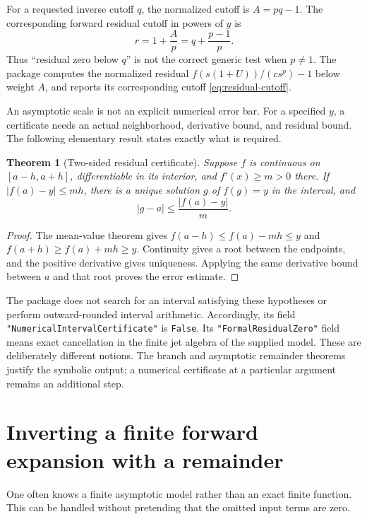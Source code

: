 \documentclass[11pt,a4paper]{article}
\numberwithin{equation}{section}
\newtheorem{theorem}{Theorem}[section]
\theoremstyle{definition}
\newcommand{\code}[1]{\texttt{#1}}
\begin{document}
For a requested inverse cutoff $q$, the normalized cutoff is $A=pq-1$.
The corresponding forward residual cutoff in powers of $y$ is
\begin{equation}\label{eq:residual-cutoff}
 r=1+\frac A p=q+\frac{p-1}{p}.
\end{equation}
Thus ``residual zero below $q$'' is not the correct generic test when
$p\ne1$. The package computes the normalized residual
$f(s(1+U))/(cs^p)-1$ below weight $A$, and reports its corresponding
cutoff \eqref{eq:residual-cutoff}.

An asymptotic scale is not an explicit numerical error bar. For a
specified $y$, a certificate needs an actual neighborhood, derivative
bound, and residual bound. The following elementary result states exactly
what is required.

\begin{theorem}[Two-sided residual certificate]\label{thm:certificate}
Suppose $f$ is continuous on $[a-h,a+h]$, differentiable in its interior,
and $f'(x)\ge m>0$ there. If $|f(a)-y|\le mh$, there is a unique solution
$g$ of $f(g)=y$ in the interval, and
\[
 |g-a|\le\frac{|f(a)-y|}{m}.
\]
\end{theorem}
\begin{proof}
The mean-value theorem gives
$f(a-h)\le f(a)-mh\le y$ and
$f(a+h)\ge f(a)+mh\ge y$. Continuity gives a root between the endpoints,
and the positive derivative gives uniqueness. Applying the same derivative
bound between $a$ and that root proves the error estimate.
\end{proof}

The package does not search for an interval satisfying these hypotheses
or perform outward-rounded interval arithmetic. Accordingly, its field
\code{"NumericalIntervalCertificate"} is \code{False}. Its
\code{"FormalResidualZero"} field means exact cancellation in the finite
jet algebra of the supplied model. These are deliberately different
notions. The branch and asymptotic remainder theorems justify the symbolic
output; a numerical certificate at a particular argument remains an
additional step.

\section{Inverting a finite forward expansion with a remainder}
\label{sec:input-remainder}

One often knows a finite asymptotic model rather than an exact finite
function. This can be handled without pretending that the omitted input
terms are zero.
\end{document}
